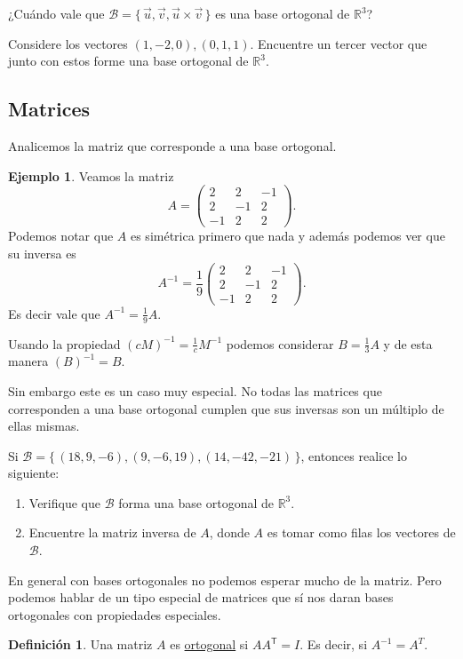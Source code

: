 \documentclass[12pt]{article}
\theoremstyle{plain}
\theoremstyle{definition}
\newtheorem*{Def}{Definición}       %
\newtheorem{Ex}[Th]{Ejemplo}           %
\theoremstyle{remark}
\newcommand{\bR}{\mathbb{R}}        %
\newcommand{\cB}{\mathcal{B}}       %
\newcommand{\sT}{\mathsf{T}}        %
\newcommand{\x}{\times}             %
\renewcommand{\:}{\colon}           %
\newcommand{\un}[1]{\underline{#1}}
\renewcommand{\.}{\Cdot}                %
\newcommand{\threebythree}[9]{\begin{pmatrix} %
  #1 & #2 & #3 \\ #4 & #5 & #6 \\ #7 & #8 & #9 \end{pmatrix}}
\newcommand{\set}[1]{\{\,#1\,\}}    %
\begin{document}
\begin{multicols}{2}
\begin{ptcbP}
¿Cuándo vale que $\cB=\set{\vec{u},\vec v,\vec u\x\vec v}$ es una base ortogonal de $\bR^3$?
\end{ptcbP}

\begin{ptcbP}
Considere los vectores $(1,-2,0),(0,1,1)$. Encuentre un tercer vector que junto con estos forme una base ortogonal de $\bR^3$.
\end{ptcbP}

\subsection*{Matrices}

Analicemos la matriz que corresponde a una base ortogonal. 

\begin{Ex}
  Veamos la matriz 
  $$A=\threebythree{2}{2}{-1}{2}{-1}{2}{-1}{2}{2}.$$
  Podemos notar que $A$ es simétrica primero que nada y además podemos ver que su inversa es 
  $$A^{-1}=\frac19\threebythree{2}{2}{-1}{2}{-1}{2}{-1}{2}{2}.$$
  Es decir vale que $A^{-1}=\frac{1}{9}A$.\par 
  Usando la propiedad $(cM)^{-1}=\frac1cM^{-1}$ podemos considerar $B=\frac13A$ y de esta manera $(B)^{-1}=B$.
\end{Ex}

Sin embargo este es un caso muy especial. No todas las matrices que corresponden a una base ortogonal cumplen que sus inversas son un múltiplo de ellas mismas.

\begin{ptcbP}
  Si $\cB=\set{(18,9,-6),(9,-6,19),(14,-42,-21)}$, entonces realice lo siguiente:
  \begin{enumerate}
    \itemsep=-0.41em
    \item Verifique que $\cB$ forma una base ortogonal de $\bR^3$.
    \item Encuentre la matriz inversa de $A$, donde $A$ es tomar como filas los vectores de $\cB$.
  \end{enumerate}
\end{ptcbP}

En general con bases ortogonales no podemos esperar mucho de la matriz. Pero podemos hablar de un tipo especial de matrices que sí nos daran bases ortogonales con propiedades especiales.

\begin{Def}
  Una matriz $A$ es \un{ortogonal} si $AA^\sT=I$. Es decir, si $A^{-1}=A^T$.
\end{Def}


\end{multicols}
\end{document}
